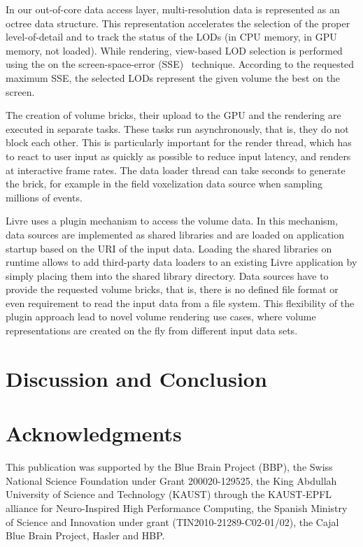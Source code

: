 \documentclass[10pt]{llncs}
\begin{document}
In our out-of-core data access layer, multi-resolution data is represented as an
octree data structure. This representation accelerates the selection of the
proper level-of-detail and to track the status of the LODs (in CPU memory, in
GPU memory, not loaded). While rendering, view-based LOD selection is performed
using the on the screen-space-error (SSE)~\cite{guthe2004} technique. According
to the requested maximum SSE, the selected LODs represent the given volume the
best on the screen.

The creation of volume bricks, their upload to the GPU and the rendering are
executed in separate tasks. These tasks run asynchronously, that is, they do not
block each other. This is particularly important for the render thread, which
has to react to user input as quickly as possible to reduce input latency, and
renders at interactive frame rates. The data loader thread can take seconds to
generate the brick, for example in the field voxelization data source when
sampling millions of events.

Livre uses a plugin mechanism to access the volume data. In this mechanism, data
sources are implemented as shared libraries and are loaded on application
startup based on the URI of the input data. Loading the shared libraries on
runtime allows to add third-party data loaders to an existing Livre application
by simply placing them into the shared library directory. Data sources have to
provide the requested volume bricks, that is, there is no defined file format or
even requirement to read the input data from a file system. This flexibility of
the plugin approach lead to novel volume rendering use cases, where volume
representations are created on the fly from different input data sets.


\section{Discussion and Conclusion}
\label{sec:conclusions}

\section*{Acknowledgments}
This publication was supported by the Blue Brain Project (BBP), the Swiss
National Science Foundation under Grant 200020-129525, the King Abdullah
University of Science and Technology (KAUST) through the KAUST-EPFL alliance for
Neuro-Inspired High Performance Computing, the Spanish Ministry of Science and
Innovation under grant (TIN2010-21289-C02-01/02), the Cajal Blue Brain Project,
Hasler and HBP.





\end{document}
